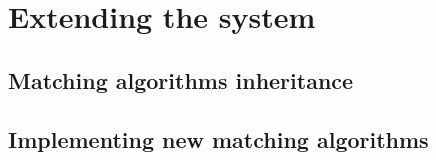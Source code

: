 \chapter{Extending the system}

\section{Matching algorithms inheritance}

\section{Implementing new matching algorithms}
